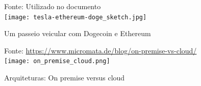 \documentclass[aspectratio=43,8pt]{beamer}%
\begin{document}
\begin{frame}[noframenumbering]
	\begin{figure}
		\centering
		{\footnotesize Fonte: Utilizado no documento}\\
		\texttt{[image: tesla-ethereum-doge\_sketch.jpg]}
		\caption{Um passeio veicular com Dogecoin e Ethereum}
	\end{figure}
\end{frame}
\begin{frame}[noframenumbering]
	\begin{figure}
		\centering
		{\footnotesize Fonte: \url{https://www.micromata.de/blog/on-premise-vs-cloud/}}\\
		\texttt{[image: on\_premise\_cloud.png]}
		\caption{Arquiteturas: On premise versus cloud}
	\end{figure}
\end{frame}
\end{document}
